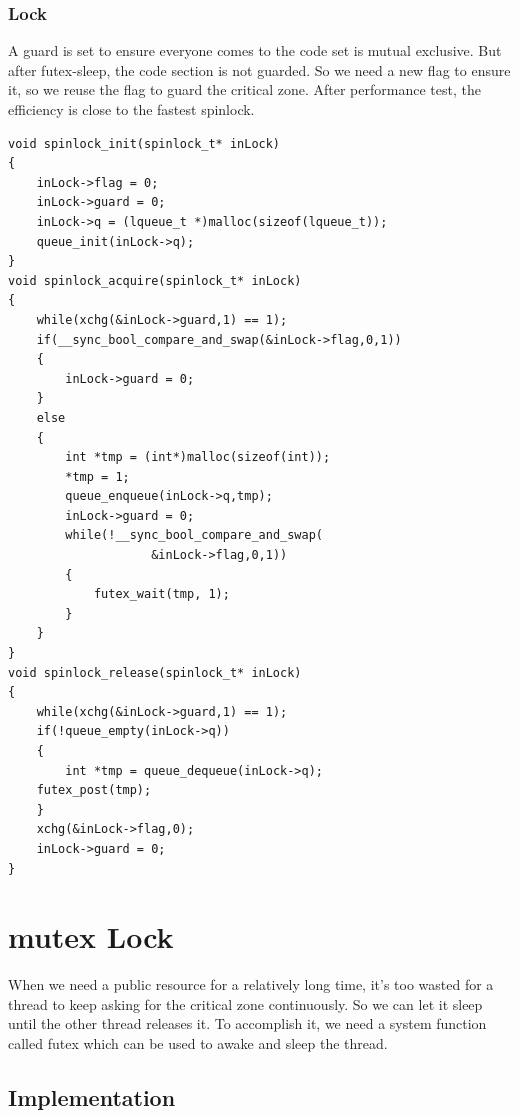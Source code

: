 \documentclass{article}
\begin{document}
	\subsubsection{Lock}
		A guard is set to ensure everyone comes to the code set is mutual exclusive. But after futex-sleep, the code section is not guarded. So we need a new flag to ensure it, so we reuse the flag to guard the critical zone. After performance test, the efficiency is close to the fastest spinlock. \\
	\begin{lstlisting}
void spinlock_init(spinlock_t* inLock)
{
	inLock->flag = 0;
	inLock->guard = 0;
	inLock->q = (lqueue_t *)malloc(sizeof(lqueue_t));
	queue_init(inLock->q);
}
void spinlock_acquire(spinlock_t* inLock)
{
	while(xchg(&inLock->guard,1) == 1);
	if(__sync_bool_compare_and_swap(&inLock->flag,0,1))
	{
		inLock->guard = 0;
	}
	else
	{
		int *tmp = (int*)malloc(sizeof(int));
		*tmp = 1;
		queue_enqueue(inLock->q,tmp);
		inLock->guard = 0;
		while(!__sync_bool_compare_and_swap(
					&inLock->flag,0,1))
		{
			futex_wait(tmp, 1);
		}
	}
}
void spinlock_release(spinlock_t* inLock)
{
	while(xchg(&inLock->guard,1) == 1);
	if(!queue_empty(inLock->q))
	{
		int *tmp = queue_dequeue(inLock->q);
	futex_post(tmp);
	}
	xchg(&inLock->flag,0);
	inLock->guard = 0;
}
	\end{lstlisting}
	\section{mutex Lock}
		When we need a public resource for a relatively long time, it's too wasted for a thread to keep asking for the critical zone continuously. So we can let it sleep until the other thread releases it. To accomplish it, we need a system function called futex which can be used to awake and sleep the thread. 
		\subsection{Implementation}
\end{document}
